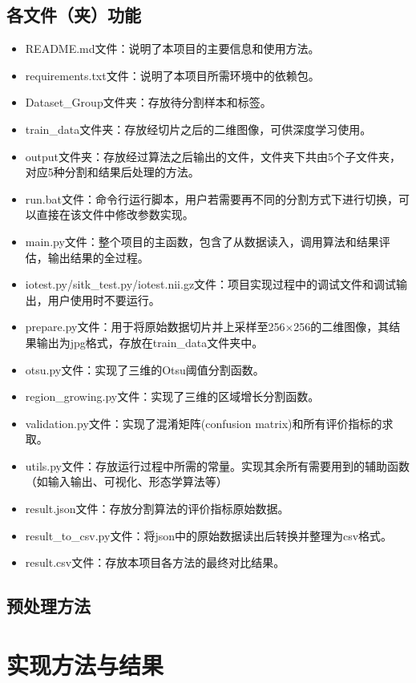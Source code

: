 \documentclass[UTF8]{ctexart}
\begin{document}
\subsection{各文件（夹）功能}
\begin{itemize}
    \item README.md文件：说明了本项目的主要信息和使用方法。
    \item requirements.txt文件：说明了本项目所需环境中的依赖包。
    \item Dataset\_Group文件夹：存放待分割样本和标签。
    \item train\_data文件夹：存放经切片之后的二维图像，可供深度学习使用。
    \item output文件夹：存放经过算法之后输出的文件，文件夹下共由5个子文件夹，对应5种分割和结果后处理的方法。
    \item run.bat文件：命令行运行脚本，用户若需要再不同的分割方式下进行切换，可以直接在该文件中修改参数实现。
    \item main.py文件：整个项目的主函数，包含了从数据读入，调用算法和结果评估，输出结果的全过程。
    \item iotest.py/sitk\_test.py/iotest.nii.gz文件：项目实现过程中的调试文件和调试输出，用户使用时不要运行。
    \item prepare.py文件：用于将原始数据切片并上采样至256$\times$256的二维图像，其结果输出为jpg格式，存放在train\_data文件夹中。
    \item otsu.py文件：实现了三维的Otsu阈值分割函数。
    \item region\_growing.py文件：实现了三维的区域增长分割函数。
    \item validation.py文件：实现了混淆矩阵(confusion matrix)和所有评价指标的求取。
    \item utils.py文件：存放运行过程中所需的常量。实现其余所有需要用到的辅助函数（如输入输出、可视化、形态学算法等）
    \item result.json文件：存放分割算法的评价指标原始数据。
    \item result\_to\_csv.py文件：将json中的原始数据读出后转换并整理为csv格式。
    \item result.csv文件：存放本项目各方法的最终对比结果。
\end{itemize}

\subsection{预处理方法}

\section{实现方法与结果}
\end{document}
